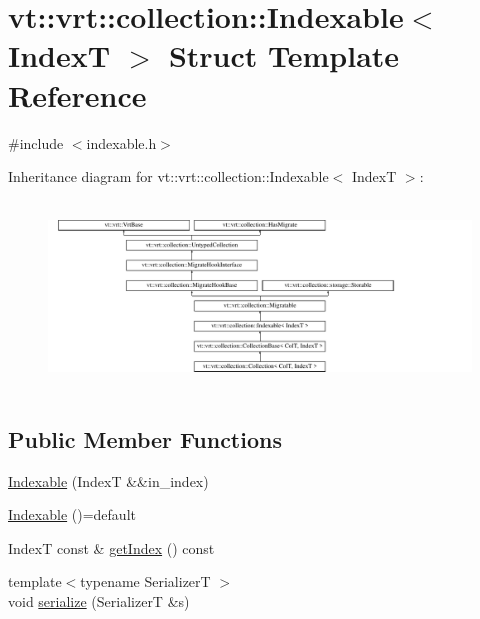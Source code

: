 \hypertarget{structvt_1_1vrt_1_1collection_1_1_indexable}{}\section{vt\+:\+:vrt\+:\+:collection\+:\+:Indexable$<$ IndexT $>$ Struct Template Reference}
\label{structvt_1_1vrt_1_1collection_1_1_indexable}


{\ttfamily \#include $<$indexable.\+h$>$}

Inheritance diagram for vt\+:\+:vrt\+:\+:collection\+:\+:Indexable$<$ IndexT $>$\+:\begin{figure}[H]
\begin{center}
\leavevmode
\includegraphics[height=5.028059cm]{structvt_1_1vrt_1_1collection_1_1_indexable}
\end{center}
\end{figure}
\subsection*{Public Member Functions}
\begin{DoxyCompactItemize}
\item 
\hyperlink{structvt_1_1vrt_1_1collection_1_1_indexable_ad3f327a35771a31ec63241b9be57569c}{Indexable} (IndexT \&\&in\+\_\+index)
\item 
\hyperlink{structvt_1_1vrt_1_1collection_1_1_indexable_a6390131bf531b7128367c51c788305c2}{Indexable} ()=default
\item 
IndexT const  \& \hyperlink{structvt_1_1vrt_1_1collection_1_1_indexable_a28d05f23e7a20e12e94b8235305c1e82}{get\+Index} () const
\item 
{\footnotesize template$<$typename SerializerT $>$ }\\void \hyperlink{structvt_1_1vrt_1_1collection_1_1_indexable_adadd30272517d10e6124a65edc48fb65}{serialize} (SerializerT \&s)
\end{DoxyCompactItemize}
